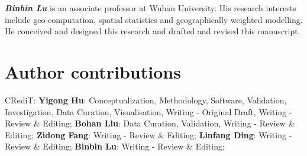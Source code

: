 \documentclass[]{interact}
\begin{document}
\emph{\textbf{Binbin Lu}} is an associate professor at Wuhan University. His research interests include geo-computation, spatial statistics and geographically weighted modelling. He conceived and designed this research and drafted and revised this manuscript.

\section*{Author contributions}

CRediT:
\textbf{Yigong Hu}: Conceptualization, Methodology, Software, Validation, Investigation, Data Curation, Visualisation, Writing - Original Draft, Writing - Review \& Editing;
\textbf{Bohan Liu}: Data Curation, Validation, Writing - Review \& Editing;
\textbf{Zidong Fang}: Writing - Review \& Editing;
\textbf{Linfang Ding}: Writing - Review \& Editing;
\textbf{Binbin Lu}: Writing - Review \& Editing;
\fi



\end{document}
